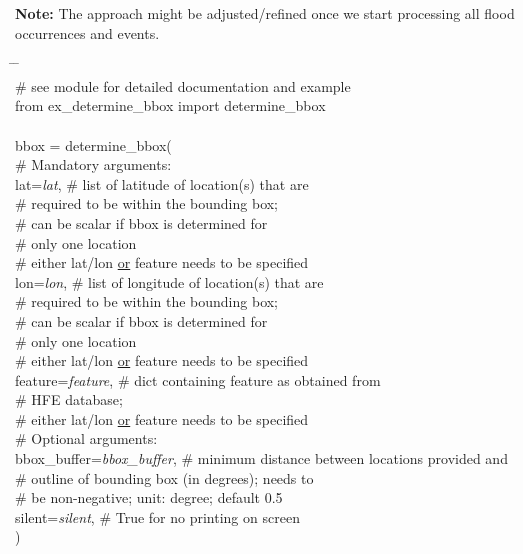 \documentclass[10pt,a4paper,titlepage,parskip]{scrartcl}
\newenvironment{ttfont}{\fontfamily{\ttdefault}\selectfont}{\par}
\newcommand{\GRAU}[1]{\textcolor{ufzgray2}{#1}}
\begin{document}
\textbf{Note:} The approach might be adjusted/refined once we start processing all flood occurrences and events.

\begin{framed}
	\vspace*{-1.2cm}
	\begin{ttfont}
		\begin{tabbing}
			\hspace{1.0cm} \= \hspace{4.7cm} \= \kill \\[4pt]
			\GRAU{\# see module for detailed documentation and example}\\
			from ex\_determine\_bbox import determine\_bbox\\
			\\
			bbox = determine\_bbox(\\
			\> \GRAU{\# Mandatory arguments:}\\
			\> lat=\textit{lat}, \> \GRAU{\# list of latitude of location(s) that are}\\
			\> \> \GRAU{\# required to be within the bounding box;}\\
			\> \> \GRAU{\# can be scalar if bbox is determined for}\\
			\> \> \GRAU{\# only one location}\\
			\> \> \GRAU{\# either lat/lon \underline{or} feature needs to be specified}\\
			\> lon=\textit{lon}, \> \GRAU{\# list of longitude of location(s) that are}\\
			\> \> \GRAU{\# required to be within the bounding box;}\\
			\> \> \GRAU{\# can be scalar if bbox is determined for}\\
			\> \> \GRAU{\# only one location}\\
			\> \> \GRAU{\# either lat/lon \underline{or} feature needs to be specified}\\
			\> feature=\textit{feature}, \> \GRAU{\# dict containing feature as obtained from}\\
			\> \> \GRAU{\# HFE database;}\\
			\> \> \GRAU{\# either lat/lon \underline{or} feature needs to be specified}\\
			\> \GRAU{\# Optional arguments:}\\
			\> bbox\_buffer=\textit{bbox\_buffer}, \> \GRAU{\# minimum distance between locations provided and}\\
			\> \> \GRAU{\# outline of bounding box (in degrees); needs to}\\
			\> \> \GRAU{\# be non-negative; unit: degree; default 0.5}\\
			\> silent=\textit{silent}, \> \GRAU{\# True for no printing on screen}\\
			\> ) \> 
		\end{tabbing}
	\end{ttfont}
	\vspace*{-0.3cm}
\end{framed}
\end{document}
